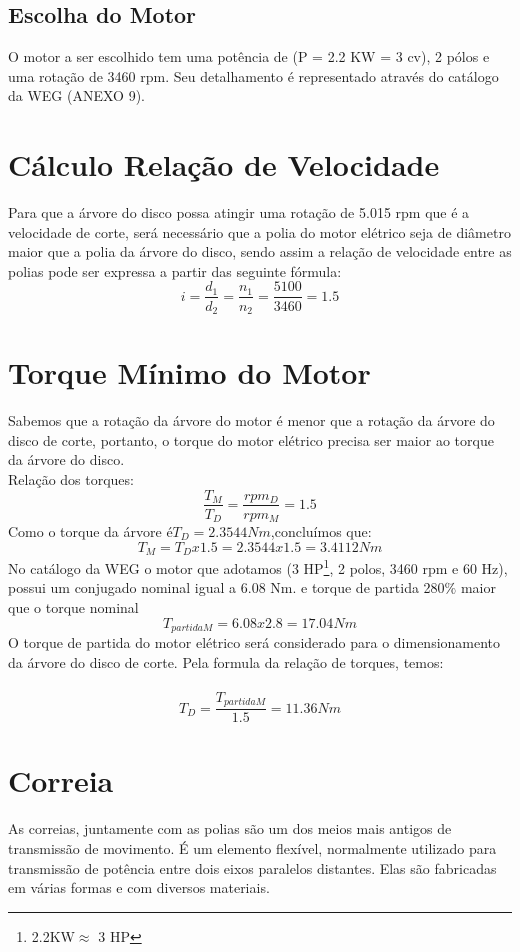 \documentclass[11pt,a4paper]{report}
\begin{document}
 \section{Escolha do Motor}
O motor a ser escolhido tem uma potência de (P = 2.2 KW = 3 cv), 2 p\'olos e
uma rota\c{c}\~ao de 3460 rpm. Seu detalhamento \'e representado atrav\'es do cat\'alogo
da WEG (ANEXO 9).\\
\chapter{C\'alculo Rela\c{c}\~ao de Velocidade}
Para que a \'arvore do disco possa atingir uma rota\c{c}\~ao de 5.015 rpm que
\'e a velocidade de corte, ser\'a necess\'ario que a polia do motor el\'etrico seja de
di\^ametro maior que a polia da \'arvore do disco, sendo assim a rela\c{c}\~ao de
velocidade entre as polias pode ser expressa a partir das seguinte f\'ormula:\\
$$i=\frac{d_1}{d_2}=\frac{n_1}{n_2}=\frac{5100}{3460}=1.5$$
\chapter{Torque M\'inimo do Motor}
Sabemos que a rotação da \'arvore do motor \'e menor que a rota\c{c}\~ao da
\'arvore do disco de corte, portanto, o torque do motor el\'etrico precisa ser maior
ao torque da \'arvore do disco.\\
Rela\c{c}\~ao dos torques:\\
$$\frac{T_M}{T_D}=\frac{rpm_D}{rpm_M}=1.5$$
Como o torque da \'arvore \'e$T_D=2.3544Nm$,conclu\'imos que:\
$$T_M=T_Dx1.5=2.3544x1.5=3.4112Nm$$
No cat\'alogo da WEG o motor que adotamos (3 HP\footnote{2.2KW$\approx$ 3 HP }, 2 polos, 3460 rpm e 60 Hz), possui um conjugado nominal igual a 6.08 Nm. e torque de partida 280$\%$ maior que o torque nominal
$$T_{partida M}=6.08x2.8=17.04Nm$$
O torque de partida do motor el\'etrico ser\'a considerado para o
dimensionamento da \'arvore do disco de corte. Pela formula da rela\c{c}\~ao de torques,
temos:\\
\\
$$T_D=\frac{T_{partida M}}{1.5}=11.36Nm$$
\chapter{Correia}
As correias, juntamente com as polias s\~ao um dos meios mais antigos de
transmiss\~ao de movimento. \'E um elemento flex\'ivel, normalmente utilizado para
transmiss\~ao de pot\^encia entre dois eixos paralelos distantes. Elas s\~ao fabricadas
em v\'arias formas e com diversos materiais.\\
\end{document}
